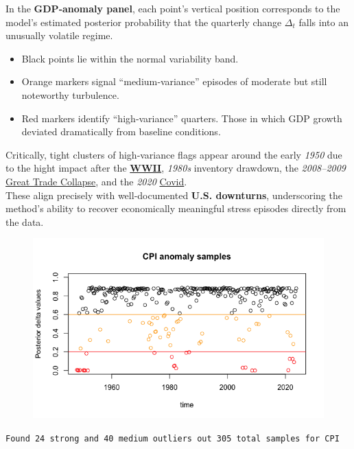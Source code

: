 \documentclass{Configuration_Files/PoliMi3i_thesis}
\begin{document}
In the \textbf{GDP‐anomaly panel}, each point’s vertical position corresponds to the model’s estimated posterior probability that the quarterly change \(\Delta_t\) falls into an unusually volatile regime.
\begin{itemize}
    \item Black points lie within the normal variability band.
    \item Orange markers signal “medium‐variance” episodes of moderate but still noteworthy turbulence.
    \item Red markers identify “high‐variance” quarters. Those in which GDP growth deviated dramatically from baseline conditions.
\end{itemize}
Critically, tight clusters of high‐variance flags appear around the early \textit{1950} due to the hight impact after the \href{https://dash.harvard.edu/server/api/core/bitstreams/7312037c-5872-6bd4-e053-0100007fdf3b/content}{\textbf{WWII}}, \textit{1980s} inventory drawdown, the \textit{2008–2009} \href{https://www.ft.com/content/ddea2c54-478b-11dd-93ca-000077b07658?utm_source}{Great Trade Collapse}, and the \textit{2020} \href{https://www.ft.com/content/806bd0f4-3c6c-49e8-afe3-389c0a1dc394?utm_source}{Covid}.\\
These align precisely with well‐documented \textbf{U.S. downturns}, underscoring the method’s ability to recover economically meaningful stress episodes directly from the data.
\begin{figure}[H]
    \centering
    \includegraphics[width=0.75\linewidth]{CPI_anomaly.png}
\end{figure}
\begin{center}
    \texttt{Found 24 strong and 40 medium outliers out 305 total samples for CPI}
\end{center}
\end{document}
